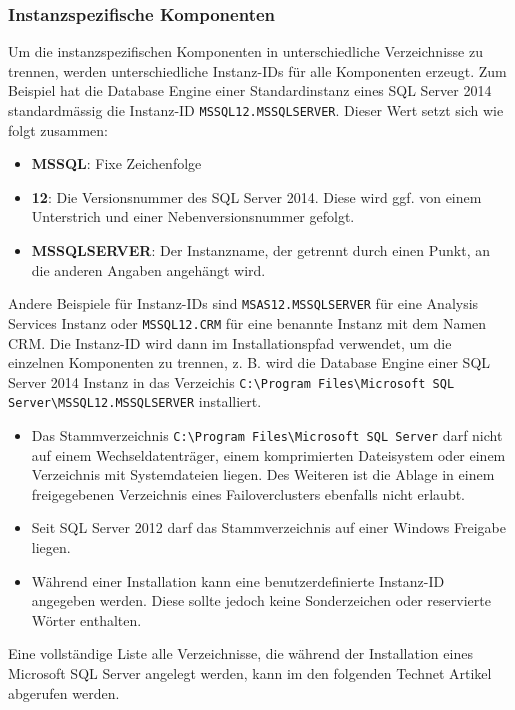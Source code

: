         \subsubsection{Instanzspezifische Komponenten}
          Um die instanzspezifischen Komponenten in unterschiedliche Verzeichnisse
          zu trennen, werden unterschiedliche Instanz-IDs für alle Komponenten
          erzeugt. Zum Beispiel hat die Database Engine einer
          Standardinstanz eines SQL Server 2014 standardmässig die Instanz-ID
          \texttt{MSSQL12.MSSQLSERVER}. Dieser Wert setzt sich wie folgt zusammen:
          \begin{itemize}
              \item \textbf{MSSQL}: Fixe Zeichenfolge
              \item \textbf{12}: Die Versionsnummer des SQL Server 2014. Diese
              wird ggf. von einem Unterstrich und einer Nebenversionsnummer
              gefolgt.
              \item \textbf{MSSQLSERVER}: Der Instanzname, der getrennt durch
              einen Punkt, an die anderen Angaben angehängt wird.
          \end{itemize}
          Andere Beispiele für Instanz-IDs sind \texttt{MSAS12.MSSQLSERVER} für
          eine Analysis Services Instanz oder \texttt{MSSQL12.CRM} für eine
          benannte Instanz mit dem Namen CRM.
\clearpage
          Die Instanz-ID wird dann im Installationspfad verwendet, um die
          einzelnen Komponenten zu trennen, z. B. wird die Database Engine einer
          SQL Server 2014 Instanz in das Verzeichis \texttt{C:\textbackslash Program Files\textbackslash Microsoft SQL
          Server\textbackslash MSSQL12.MSSQLSERVER} installiert.
          \begin{merke}
            \begin{itemize}
                \item Das Stammverzeichnis \texttt{C:\textbackslash Program Files\textbackslash Microsoft SQL
                Server} darf nicht auf einem Wechseldatenträger, einem
                komprimierten Dateisystem oder einem Verzeichnis mit Systemdateien
                liegen. Des Weiteren ist die Ablage in einem freigegebenen
                Verzeichnis eines Failoverclusters ebenfalls nicht erlaubt.
                \item Seit SQL Server 2012 darf das Stammverzeichnis auf einer
                Windows Freigabe liegen.
                \item Während einer Installation kann eine benutzerdefinierte
                Instanz-ID angegeben werden. Diese sollte jedoch keine
                Sonderzeichen oder reservierte Wörter enthalten.
            \end{itemize}
          \end{merke}
          Eine vollständige Liste alle Verzeichnisse, die während der Installation
          eines Microsoft SQL Server angelegt werden, kann im den folgenden
          Technet Artikel abgerufen werden.
          \begin{literaturinternet}
            \item \cite{ms143547}
          \end{literaturinternet}

